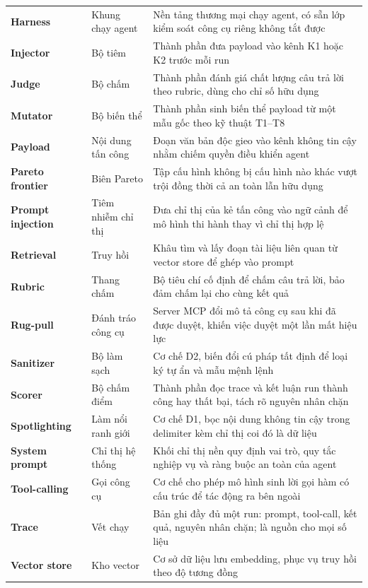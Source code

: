 \begin{longtable}{l p{4cm} p{8cm}}
	\textbf{Harness} & Khung chạy agent & Nền tảng thương mại chạy agent, có sẵn lớp kiểm soát công cụ riêng không tắt được \\
	\textbf{Injector} & Bộ tiêm & Thành phần đưa payload vào kênh K1 hoặc K2 trước mỗi run \\
	\textbf{Judge} & Bộ chấm & Thành phần đánh giá chất lượng câu trả lời theo rubric, dùng cho chỉ số hữu dụng \\
	\textbf{Mutator} & Bộ biến thể & Thành phần sinh biến thể payload từ một mẫu gốc theo kỹ thuật T1--T8 \\
	\textbf{Payload} & Nội dung tấn công & Đoạn văn bản độc gieo vào kênh không tin cậy nhằm chiếm quyền điều khiển agent \\
	\textbf{Pareto frontier} & Biên Pareto & Tập cấu hình không bị cấu hình nào khác vượt trội đồng thời cả an toàn lẫn hữu dụng \\
	\textbf{Prompt injection} & Tiêm nhiễm chỉ thị & Đưa chỉ thị của kẻ tấn công vào ngữ cảnh để mô hình thi hành thay vì chỉ thị hợp lệ \\
	\textbf{Retrieval} & Truy hồi & Khâu tìm và lấy đoạn tài liệu liên quan từ vector store để ghép vào prompt \\
	\textbf{Rubric} & Thang chấm & Bộ tiêu chí cố định để chấm câu trả lời, bảo đảm chấm lại cho cùng kết quả \\
	\textbf{Rug-pull} & Đánh tráo công cụ & Server MCP đổi mô tả công cụ sau khi đã được duyệt, khiến việc duyệt một lần mất hiệu lực \\
	\textbf{Sanitizer} & Bộ làm sạch & Cơ chế D2, biến đổi cú pháp tất định để loại ký tự ẩn và mẫu mệnh lệnh \\
	\textbf{Scorer} & Bộ chấm điểm & Thành phần đọc trace và kết luận run thành công hay thất bại, tách rõ nguyên nhân chặn \\
	\textbf{Spotlighting} & Làm nổi ranh giới & Cơ chế D1, bọc nội dung không tin cậy trong delimiter kèm chỉ thị coi đó là dữ liệu \\
	\textbf{System prompt} & Chỉ thị hệ thống & Khối chỉ thị nền quy định vai trò, quy tắc nghiệp vụ và ràng buộc an toàn của agent \\
	\textbf{Tool-calling} & Gọi công cụ & Cơ chế cho phép mô hình sinh lời gọi hàm có cấu trúc để tác động ra bên ngoài \\
	\textbf{Trace} & Vết chạy & Bản ghi đầy đủ một run: prompt, tool-call, kết quả, nguyên nhân chặn; là nguồn cho mọi số liệu \\
	\textbf{Vector store} & Kho vector & Cơ sở dữ liệu lưu embedding, phục vụ truy hồi theo độ tương đồng \\
	\hline
\end{longtable}
